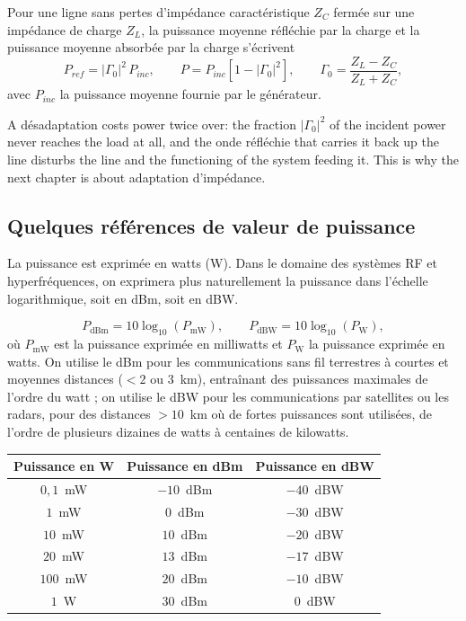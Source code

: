\begin{theorem}
  Pour une ligne sans pertes d'impédance caractéristique $Z_C$ fermée sur une
  impédance de charge $Z_L$, la puissance moyenne réfléchie par la charge et la
  puissance moyenne absorbée par la charge s'écrivent
  \[
    \boxed{\;
    P_{ref} = |\Gamma_0|^{2}\,P_{inc},
    \qquad
    P = P_{inc}\left[1 - |\Gamma_0|^{2}\right],
    \qquad
    \Gamma_0 = \frac{Z_L - Z_C}{Z_L + Z_C},
    \;}
  \]
  avec $P_{inc}$ la puissance moyenne fournie par le générateur.
\end{theorem}

\begin{conclusion}
  A désadaptation costs power twice over: the fraction $|\Gamma_0|^2$ of the
  incident power never reaches the load at all, and the onde réfléchie that
  carries it back up the line disturbs the line and the functioning of the
  system feeding it. This is why the next chapter is about adaptation
  d'impédance.
\end{conclusion}

\subsection{Quelques références de valeur de puissance}
La puissance est exprimée en watts (W). Dans le domaine des systèmes RF et
hyperfréquences, on exprimera plus naturellement la puissance dans l'échelle
logarithmique, soit en dBm, soit en dBW.

\begin{definition}
  \[
    P_{\mathrm{dBm}} = 10\log_{10}\left(P_{\mathrm{mW}}\right),
    \qquad
    P_{\mathrm{dBW}} = 10\log_{10}\left(P_{\mathrm{W}}\right),
  \]
  où $P_{\mathrm{mW}}$ est la puissance exprimée en milliwatts et
  $P_{\mathrm{W}}$ la puissance exprimée en watts. On utilise le dBm pour les
  communications sans fil terrestres à courtes et moyennes distances ($<2$ ou
  3~km), entraînant des puissances maximales de l'ordre du watt ; on utilise le
  dBW pour les communications par satellites ou les radars, pour des distances
  $>10$~km où de fortes puissances sont utilisées, de l'ordre de plusieurs
  dizaines de watts à centaines de kilowatts.
\end{definition}

\begin{center}
  \begin{tabular}{ccc}
    \toprule
    Puissance en W & Puissance en dBm & Puissance en dBW \\
    \midrule
    $0{,}1$~mW & $-10$~dBm & $-40$~dBW \\
    $1$~mW     & $0$~dBm   & $-30$~dBW \\
    $10$~mW    & $10$~dBm  & $-20$~dBW \\
    $20$~mW    & $13$~dBm  & $-17$~dBW \\
    $100$~mW   & $20$~dBm  & $-10$~dBW \\
    $1$~W      & $30$~dBm  & $0$~dBW \\
    \bottomrule
  \end{tabular}
\end{center}

